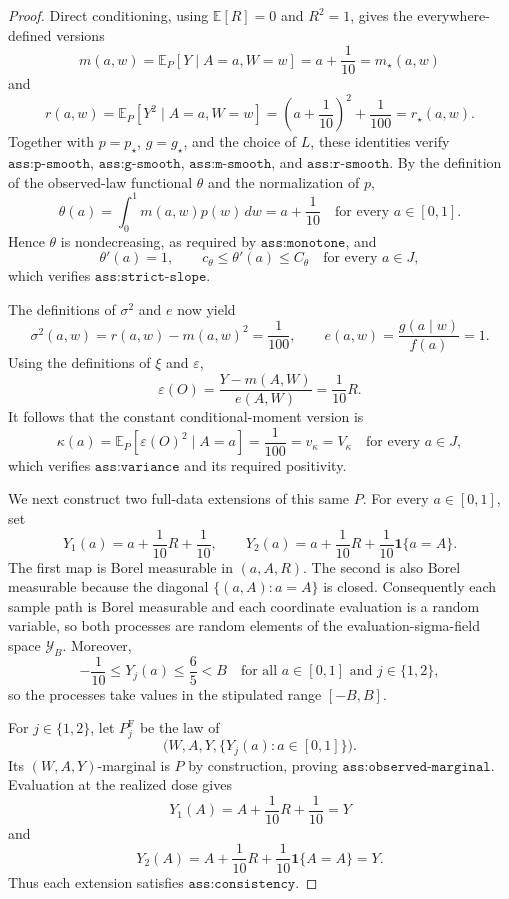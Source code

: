 \documentclass{article}
\begin{document}
\begin{proof}
Direct conditioning, using \(\mathbb E[R]=0\) and \(R^2=1\), gives the everywhere-defined versions
\[
 m(a,w)=\mathbb E_P[Y\mid A=a,W=w]=a+\frac1{10}=m_\star(a,w)
\]
and
\[
 r(a,w)=\mathbb E_P[Y^2\mid A=a,W=w]
 =\left(a+\frac1{10}\right)^2+\frac1{100}=r_\star(a,w).
\]
Together with \(p=p_\star\), \(g=g_\star\), and the choice of \(L\), these identities verify \(\texttt{ass:p-smooth}\), \(\texttt{ass:g-smooth}\), \(\texttt{ass:m-smooth}\), and \(\texttt{ass:r-smooth}\).  By the definition of the observed-law functional \(\theta\) and the normalization of \(p\),
\[
 \theta(a)=\int_0^1m(a,w)p(w)\,dw=a+\frac1{10}
 \quad\text{for every }a\in[0,1].
\]
Hence \(\theta\) is nondecreasing, as required by \(\texttt{ass:monotone}\), and
\[
 \theta'(a)=1,
 \qquad c_{\theta}\le\theta'(a)\le C_{\theta}
 \quad\text{for every }a\in J,
\]
which verifies \(\texttt{ass:strict-slope}\).

The definitions of \(\sigma^2\) and \(e\) now yield
\[
 \sigma^2(a,w)=r(a,w)-m(a,w)^2=\frac1{100},
 \qquad e(a,w)=\frac{g(a\mid w)}{f(a)}=1.
\]
Using the definitions of \(\xi\) and \(\varepsilon\),
\[
 \varepsilon(O)=\frac{Y-m(A,W)}{e(A,W)}=\frac1{10}R.
\]
It follows that the constant conditional-moment version is
\[
 \kappa(a)=\mathbb E_P[\varepsilon(O)^2\mid A=a]
 =\frac1{100}=v_{\kappa}=V_{\kappa}
 \quad\text{for every }a\in J,
\]
which verifies \(\texttt{ass:variance}\) and its required positivity.

We next construct two full-data extensions of this same \(P\).  For every \(a\in[0,1]\), set
\[
 Y_1(a)=a+\frac1{10}R+\frac1{10},
 \qquad
 Y_2(a)=a+\frac1{10}R+\frac1{10}\mathbf 1\{a=A\}.
\]
The first map is Borel measurable in \((a,A,R)\).  The second is also Borel measurable because the diagonal \(\{(a,A):a=A\}\) is closed.  Consequently each sample path is Borel measurable and each coordinate evaluation is a random variable, so both processes are random elements of the evaluation-sigma-field space \(\mathcal Y_B\).  Moreover,
\[
 -\frac1{10}\le Y_j(a)\le\frac65<B
 \quad\text{for all }a\in[0,1]\text{ and }j\in\{1,2\},
\]
so the processes take values in the stipulated range \([-B,B]\).

For \(j\in\{1,2\}\), let \(P_j^{\mathrm F}\) be the law of
\[
 \bigl(W,A,Y,\{Y_j(a):a\in[0,1]\}\bigr).
\]
Its \((W,A,Y)\)-marginal is \(P\) by construction, proving \(\texttt{ass:observed-marginal}\).  Evaluation at the realized dose gives
\[
 Y_1(A)=A+\frac1{10}R+\frac1{10}=Y
\]
and
\[
 Y_2(A)=A+\frac1{10}R+\frac1{10}\mathbf 1\{A=A\}=Y.
\]
Thus each extension satisfies \(\texttt{ass:consistency}\).


\end{proof}
\end{document}
